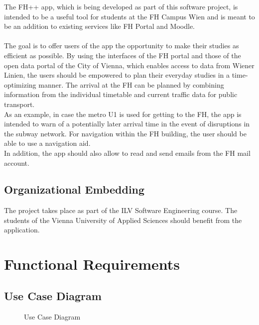 \documentclass{scrreprt}
\begin{document}
	The FH++ app, which is being developed as part of this software project, is intended to be a useful tool for students at the FH Campus Wien and is meant to be an addition to existing services like FH Portal and Moodle. \\ \\
	The goal is to offer users of the app the opportunity to make their studies as efficient as possible.
	By using the interfaces of the FH portal and those of the open data portal of the City of Vienna, which enables access to data from Wiener Linien,
	the users should be empowered to plan their everyday studies in a time-optimizing manner.
	The arrival at the FH can be planned by combining information from the individual timetable and current traffic data for public transport. \\
	As an example, in case the metro U1 is used for getting to the FH, the app is intended to warn of a potentially later arrival time in the event of disruptions in the subway network.
	For navigation within the FH building, the user should be able to use a navigation aid. \\
	In addition, the app should also allow to read and send emails from the FH mail account.
	
	\section{Organizational Embedding}
	The project takes place as part of the ILV Software Engineering course. The students of the Vienna University of Applied Sciences should benefit from the application.
	
	\chapter{Functional Requirements}
	
	\section{Use Case Diagram}
	
	\begin{figure} [h]
		\centering
		\caption{Use Case Diagram}
		\label{fig:usecasediagram}
	\end{figure}
	
\end{document}
